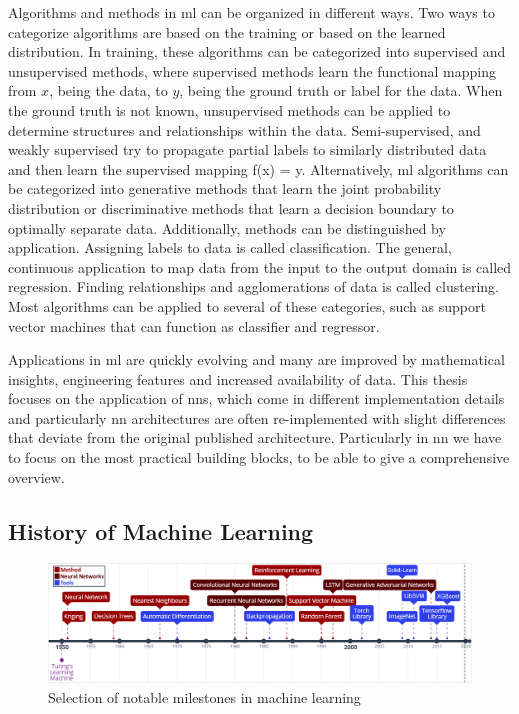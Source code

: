 Algorithms and methods in \ac{ml} can be organized in different ways. Two ways to categorize algorithms are based on the training or based on the learned distribution. In training, these algorithms can be categorized into supervised and unsupervised methods, where supervised methods learn the functional mapping from $x$, being the data, to $y$, being the ground truth or label for the data. When the ground truth is not known, unsupervised methods can be applied to determine structures and relationships within the data. Semi-supervised, and weakly supervised try to propagate partial labels to similarly distributed data and then learn the supervised mapping f(x) = y. Alternatively, \ac{ml} algorithms can be categorized into generative methods that learn the joint probability distribution or discriminative methods that learn a decision boundary to optimally separate data. Additionally, methods can be distinguished by application. Assigning labels to data is called classification. The general, continuous application to map data from the input to the output domain is called regression. Finding relationships and agglomerations of data is called clustering. Most algorithms can be applied to several of these categories, such as support vector machines that can function as classifier and regressor. 

Applications in \ac{ml} are quickly evolving and many are improved by mathematical insights, engineering features and increased availability of data. This thesis focuses on the application of \acp{nn}, which come in different implementation details and particularly \ac{nn} architectures are often re-implemented with slight differences that deviate from the original published architecture. Particularly in \ac{nn} we have to focus on the most practical building blocks, to be able to give a comprehensive overview.

\subsection{History of Machine Learning}

\begin{figure}[!ht]
    \centering
    \hspace*{-1.5cm}
    \includegraphics[width=1.15\textwidth]{figures/ML-Timeline.png}
    \caption{Selection of notable milestones in machine learning}
    \label{fig:mltimeline}
\end{figure}

